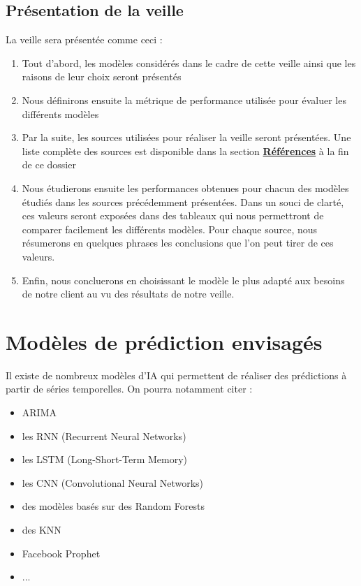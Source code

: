 \documentclass[french]{article}
\begin{document}
    \subsection{Présentation de la veille}
    La veille sera présentée comme ceci :
    \begin{enumerate}
        \item Tout d'abord, les modèles considérés dans le cadre de cette veille ainsi que les raisons de leur choix seront présentés
        \item Nous définirons ensuite la métrique de performance utilisée pour évaluer les différents modèles 
        \item Par la suite, les sources utilisées pour réaliser la veille seront présentées. Une liste complète des sources est disponible dans la section \textbf{\hyperref[sec:references]{Références}} à la fin de ce dossier
        \item Nous étudierons ensuite les performances obtenues pour chacun des modèles étudiés dans les sources précédemment présentées. Dans un souci de clarté, ces valeurs seront exposées dans des tableaux qui nous permettront de comparer facilement les différents modèles. Pour chaque source, nous résumerons en quelques phrases les conclusions que l'on peut tirer de ces valeurs. 
        \item Enfin, nous concluerons en choisissant le modèle le plus adapté aux besoins de notre client au vu des résultats de notre veille.
    \end{enumerate}
    \section{Modèles de prédiction envisagés}

    Il existe de nombreux modèles d'IA qui permettent de réaliser des prédictions à partir de séries temporelles. On pourra notamment citer :
    \begin{itemize}
        \item ARIMA
        \item les RNN (Recurrent Neural Networks)
        \item les LSTM (Long-Short-Term Memory)
        \item les CNN (Convolutional Neural Networks)
        \item des modèles basés sur des Random Forests
        \item des KNN
        \item Facebook Prophet
        \item ...
    \end{itemize}
    
\end{document}
